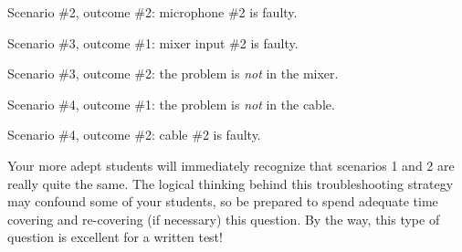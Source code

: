 \vskip 5pt

Scenario \#2, outcome \#2: microphone \#2 is faulty.

\vskip 20pt

Scenario \#3, outcome \#1: mixer input \#2 is faulty.

\vskip 5pt

Scenario \#3, outcome \#2: the problem is {\it not} in the mixer.

\vskip 20pt

Scenario \#4, outcome \#1: the problem is {\it not} in the cable.

\vskip 5pt

Scenario \#4, outcome \#2: cable \#2 is faulty.








Your more adept students will immediately recognize that scenarios 1 and 2 are really quite the same.  The logical thinking behind this troubleshooting strategy may confound some of your students, so be prepared to spend adequate time covering and re-covering (if necessary) this question.  By the way, this type of question is excellent for a written test!




